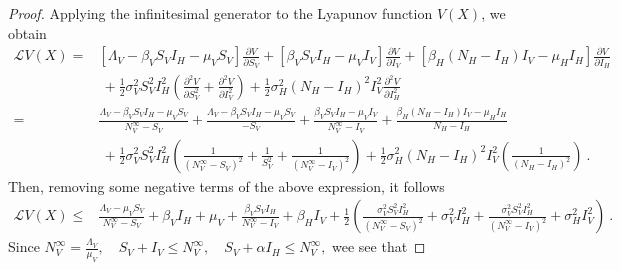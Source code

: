 \begin{proof}
	Applying the infinitesimal generator to the Lyapunov function 
	$V\left( X\right)$, we obtain
	\begin{align*}
		\mathcal{L}V(X) = &
			\left[\Lambda_{V} - \beta_{V} S_{V} I_{H} - \mu_{V} S_{V} 
			\right]\frac{\partial V}{\partial S_{V}}
			+
			\left[\beta_{V} S_{V} I_{H} - \mu_{V} 
			I_{V}\right]\frac{\partial V}{\partial I_{V}}
			+
			\left[\beta_{H} \left(N_{H} - I_{H}\right) I_{V} - \mu_{H} 
			I_{H}\right]\frac{\partial V}{\partial I_{H}}\\
			&\ 
			+
			\frac{1}{2}\sigma_{V}^{2}S_{V}^{2}I_{H}^{2}\left(\frac{\partial^{2}V}{\partial
			 S_{V}^{2}} + \frac{\partial^{2}V}{\partial I_{V}^{2}}\right)
			+
			\frac{1}{2}\sigma_{H}^{2}\left(N_{H} - 
			I_{H}\right)^{2}I_{V}^{2}\frac{\partial^{2}V}{\partial
			I_{H}^{2}}\\[0.2cm]
			= & 
			\frac{\Lambda_{V} - \beta_{V} S_{V} I_{H} - \mu_{V} 
			S_{V}}{N_{V}^{\infty} - S_{V}}
			+
			\frac{\Lambda_{V} - \beta_{V} S_{V} I_{H} - \mu_{V} S_{V}}{- 
			S_{V}}
			+
			\frac{\beta_{V} S_{V} I_{H} - \mu_{V}I_{V}}{N_{V}^{\infty} - 
			I_{V}}
			+
			\frac{\beta_{H} \left(N_{H} - I_{H}\right) I_{V} - \mu_{H} 
			I_{H}}{N_{H} - I_{H}}\\
			&\ 
			+
			\frac{1}{2}\sigma_{V}^{2}S_{V}^{2}I_{H}^{2}\left(\frac{1}
			{\left(N_{V}^{\infty} - S_{V}\right)^{2}} + \frac{1}
			{S_{V}^{2}} + \frac{1}{\left(N_{V}^{\infty} - 
			I_{V}\right)^{2}}\right)
			+
			\frac{1}{2}\sigma_{H}^{2}\left(N_{H} - 
			I_{H}\right)^{2}I_{V}^{2}\left(\frac{1}{\left(N_{H} - 
			I_{H}\right)^{2}}\right)~.
	\end{align*}
	Then, removing some negative terms of the above expression, it follows
	\begin{align*}
	\mathcal{L}V(X) \leq &
		\frac{\Lambda_{V} - \mu_{V}S_{V}}{N_{V}^{\infty} - S_{V}}
		+
		\beta_{V}I_{H} + \mu_{V}
		+
		\frac{\beta_{V} S_{V} I_{H}}{N_{V}^{\infty} - I_{V}}
		+
		\beta_{H}I_{V}
		+
		\frac{1}{2}\left(\frac{\sigma_{V}^{2}S_{V}^{2}I_{H}^{2}}
		{\left(N_{V}^{\infty} - S_{V}\right)^{2}} + \sigma_{V}^{2}I_{H}^{2} + 
		\frac{\sigma_{V}^{2}S_{V}^{2}I_{H}^{2}}{\left(N_{V}^{\infty} - 		
		I_{V}\right)^{2}} + \sigma_{H}^{2}I_{V}^{2}\right)~.
	\end{align*}
	Since 
    $
        \displaystyle
        N_{V}^{\infty} = 
            \frac{
                \Lambda_{V}
            }{\mu_{V}},
        \quad 
        S_{V} + I_{V}
        \leq 
            N_{V}^{\infty},
        \quad 
        S_{V} + \alpha I_{H}
        \leq 
            N_{V}^{\infty},
    $ 
    wee see that

\end{proof}
